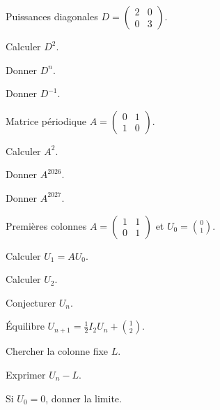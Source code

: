 \exercices
{}
\begingroup\renewcommand{\otBesoinPlace}[1]{}\begin{minipage}{\linewidth}
\begin{exercice}[1]{Puissances diagonales}
$D=\begin{pmatrix}2&0\\0&3\end{pmatrix}$.
\begin{questions}
\item Calculer $D^2$.
\item Donner $D^n$.
\item Donner $D^{-1}$.
\end{questions}
\end{exercice}
\begin{exercice}[1]{Matrice périodique}
$A=\begin{pmatrix}0&1\\1&0\end{pmatrix}$.
\begin{questions}
\item Calculer $A^2$.
\item Donner $A^{2026}$.
\item Donner $A^{2027}$.
\end{questions}
\end{exercice}
\begin{exercice}[1]{Premières colonnes}
$A=\begin{pmatrix}1&1\\0&1\end{pmatrix}$ et $U_0=\binom01$.
\begin{questions}
\item Calculer $U_1=AU_0$.
\item Calculer $U_2$.
\item Conjecturer $U_n$.
\end{questions}
\end{exercice}
\begin{exercice}[1]{Équilibre}
$U_{n+1}=\frac12I_2U_n+\binom12$.
\begin{questions}
\item Chercher la colonne fixe $L$.
\item Exprimer $U_n-L$.
\item Si $U_0=0$, donner la limite.
\end{questions}
\end{exercice}
\end{minipage}\endgroup
\clearpage
{}
